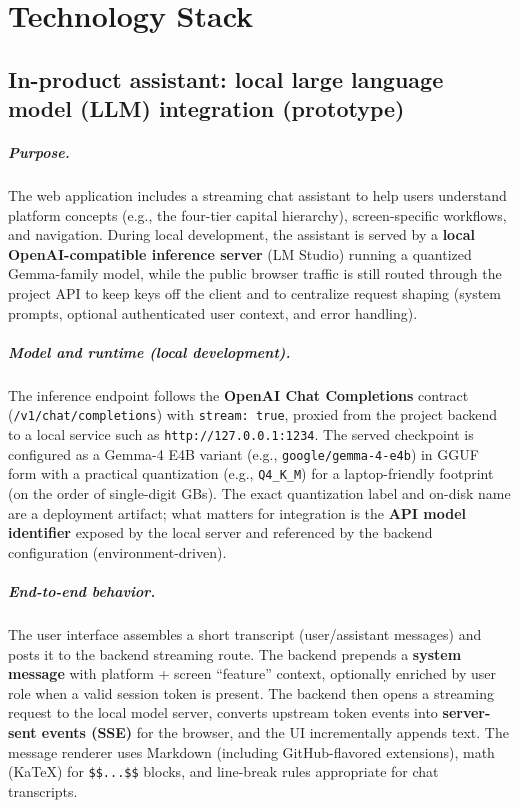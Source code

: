 \documentclass[12pt,a4paper]{report}
\begin{document}
\appendix

\chapter{Technology Stack}

\section{In-product assistant: local large language model (LLM) integration (prototype)}

\paragraph{Purpose.}
The web application includes a streaming chat assistant to help users understand platform concepts (e.g., the four-tier capital hierarchy), screen-specific workflows, and navigation. During local development, the assistant is served by a \textbf{local OpenAI-compatible inference server} (LM Studio) running a quantized Gemma-family model, while the public browser traffic is still routed through the project API to keep keys off the client and to centralize request shaping (system prompts, optional authenticated user context, and error handling).

\paragraph{Model and runtime (local development).}
The inference endpoint follows the \textbf{OpenAI Chat Completions} contract (\texttt{/v1/chat/completions}) with \texttt{stream: true}, proxied from the project backend to a local service such as \texttt{http://127.0.0.1:1234}. The served checkpoint is configured as a Gemma-4 E4B variant (e.g., \texttt{google/gemma-4-e4b}) in GGUF form with a practical quantization (e.g., \texttt{Q4\_K\_M}) for a laptop-friendly footprint (on the order of single-digit GBs). The exact quantization label and on-disk name are a deployment artifact; what matters for integration is the \textbf{API model identifier} exposed by the local server and referenced by the backend configuration (environment-driven).

\paragraph{End-to-end behavior.}
The user interface assembles a short transcript (user/assistant messages) and posts it to the backend streaming route. The backend prepends a \textbf{system message} with platform + screen ``feature'' context, optionally enriched by user role when a valid session token is present. The backend then opens a streaming request to the local model server, converts upstream token events into \textbf{server-sent events (SSE)} for the browser, and the UI incrementally appends text. The message renderer uses Markdown (including GitHub-flavored extensions), math (KaTeX) for \texttt{\$\$...\$\$} blocks, and line-break rules appropriate for chat transcripts.
\end{document}
